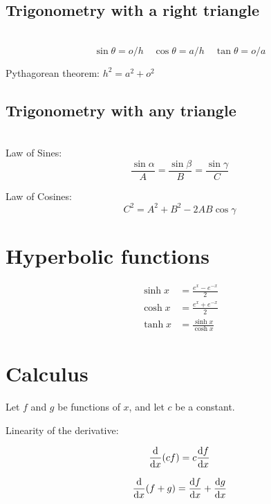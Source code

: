 \subsection{Trigonometry with a right triangle}

\noindent{}\\
  \begin{equation*}
 \sin\theta  = o/h \quad
 \cos\theta = a/h \quad
 \tan\theta = o/a
 \end{equation*}

Pythagorean theorem: $h^2=a^2+o^2$

\subsection{Trigonometry with any triangle}

\\
Law of Sines:
  \begin{equation*} \frac{\sin\alpha}{A}=\frac{\sin\beta}{B}=\frac{\sin\gamma}{C} \end{equation*}

\noindent Law of Cosines:
  \begin{equation*} C^2 = A^2 + B^2 - 2AB \cos \gamma \end{equation*}

\section{Hyperbolic functions}

\begin{align*}
  \sinh x &= \frac{e^x-e^{-x}}{2} \\
  \cosh x &= \frac{e^x+e^{-x}}{2} \\
  \tanh x &= \frac{\sinh x}{\cosh x}
\end{align*}

\section{Calculus}

\noindent Let $f$ and $g$ be functions of $x$, and let $c$ be a constant.

\noindent Linearity of the derivative:

\begin{equation*} \frac{\textup{d}}{\textup{d} x}(cf)=c \frac{\textup{d} f}{\textup{d} x} \end{equation*}

\begin{equation*} \frac{\textup{d}}{\textup{d} x}(f+g)=\frac{\textup{d} f}{\textup{d} x} + \frac{\textup{d} g}{\textup{d} x} \end{equation*}

